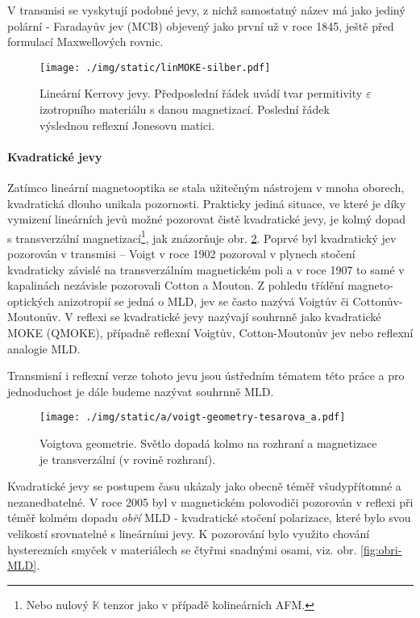 V transmisi se vyskytují podobné jevy, z nichž samostatný název má jako jediný polární - Faradayův jev (MCB) objevený jako první už v roce 1845, ještě před formulací Maxwellových rovnic\cite{zvezdinModernMagnetoopticsMagnetooptical1997}.

\begin{figure}[htbp]
    \centering
    \texttt{[image: ./img/static/linMOKE-silber.pdf]}
    \caption{Lineární Kerrovy jevy. Předposlední řádek uvádí tvar permitivity $\varepsilon$ izotropního materiálu s danou magnetizací. Poslední řádek výslednou reflexní Jonesovu matici. \cite{silberQuadraticMagnetoopticKerr2019a}}
    \label{fig:MOKE-Silber}
\end{figure}

\paragraph{Kvadratické jevy}

Zatímco lineární magnetooptika se stala užitečným nástrojem v mnoha oborech, kvadratická dlouho unikala pozornosti.
Prakticky jediná situace, ve které je díky vymizení lineárních jevů možné pozorovat čistě kvadratické jevy, je kolmý dopad s transverzální magnetizací\footnote{Nebo nulový $\mathbb{K}$ tenzor jako v případě kolineárních AFM.}, jak znázorňuje obr. \ref{fig:Voigtova-geometrie}.
Poprvé byl kvadratický jev pozorován v transmisi -- Voigt v roce 1902 pozoroval v plynech stočení kvadraticky závislé na transverzálním magnetickém poli a v roce 1907 to samé v kapalinách nezávisle pozorovali Cotton a Mouton\cite{zvezdinModernMagnetoopticsMagnetooptical1997}.
Z pohledu třídění magneto-optických anizotropií se jedná o MLD, jev se často nazývá Voigtův či Cottonův-Moutonův.
V reflexi se kvadratické jevy nazývají souhrnně jako kvadratické MOKE (QMOKE), případně reflexní Voigtův, Cotton-Moutonův jev nebo reflexní analogie MLD.

Transmisní i reflexní verze tohoto jevu jsou ústředním tématem této práce a pro jednoduchost je dále budeme nazývat souhrnně MLD.

\begin{figure}[htbp]
    \centering
    \texttt{[image: ./img/static/a/voigt-geometry-tesarova\_a.pdf]}
    \caption{Voigtova geometrie. Světlo dopadá kolmo na rozhraní a magnetizace je transverzální (v rovině rozhraní). \cite{tesarovaSystematicStudyMagnetic2014}}
    \label{fig:Voigtova-geometrie}
\end{figure}

Kvadratické jevy se postupem času ukázaly jako obecně téměř všudypřítomné a nezanedbatelné.
V roce 2005 byl v magnetickém polovodiči  pozorován v reflexi při téměř kolmém dopadu \emph{obří} MLD - kvadratické stočení polarizace, které bylo svou velikostí srovnatelné s lineárními jevy\cite{kimelObservationGiantMagnetic2005}.
K pozorování bylo využito chování hysterezních smyček v materiálech se čtyřmi snadnými osami, viz. obr. \ref{fig:obri-MLD}.

